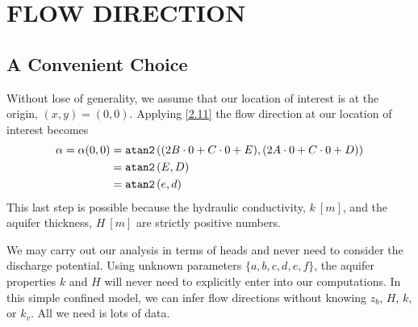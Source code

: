 \documentclass[12pt]{article}
\begin{document}
\section{FLOW DIRECTION}
\subsection{A Convenient Choice}
Without lose of generality, we assume that our location of interest is at the origin, $(x,y) = (0,0)$.  Applying \eqref{2.11} the flow direction at our location of interest becomes
%
\begin{align}\label{5.1}
    \alpha = \alpha(0,0)
    &= \text{\tt atan2}\left((2B \cdot 0 + C \cdot 0 + E), (2A \cdot 0 + C \cdot 0 + D)\right) \nonumber\\
    &= \text{\tt atan2}\left(E, D\right) \nonumber\\
    &= \text{\tt atan2}\left(e, d\right)
\end{align}
%
This last step is possible because the hydraulic conductivity, $k~[m]$, and the aquifer thickness, $H~[m]$ are strictly positive numbers.

We may carry out our analysis in terms of heads and never need to consider the discharge potential.  Using unknown parameters $\{a, b, c, d, e, f \}$, the aquifer properties $k$ and $H$ will never need to explicitly enter into our computations.  In this simple confined model, we can infer flow directions without knowing $z_b$, $H$, $k$, or $k_v$. All we need is lots of data.

\end{document}
